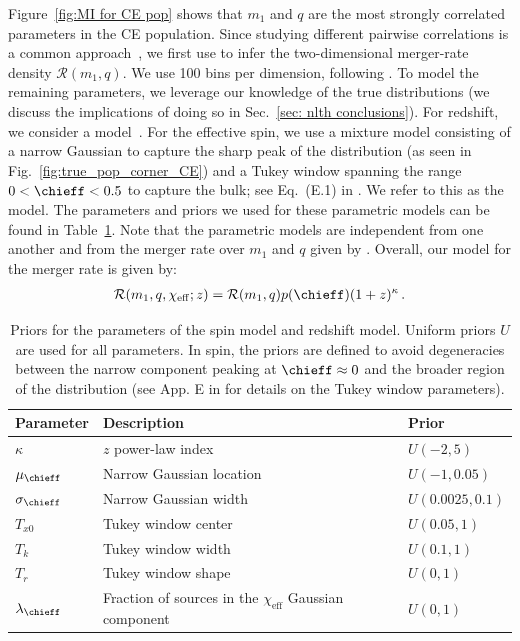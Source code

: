 \begin{refsection}
Figure~\ref{fig:MI for CE pop} shows that $m_1$ and $q$ are the most strongly correlated parameters in the \ac{CE} population. Since studying different pairwise correlations is a common approach~\citep{Heinzel:2024hva}, we first use \PixelPop to infer the two-dimensional merger-rate density $\mathcal{R}(m_1,q)$. We use 100 bins per dimension, following \citet{Heinzel:2024jlc}. To model the remaining parameters, we leverage our knowledge of the true distributions (we discuss the implications of doing so in Sec.~\ref{sec: nlth conclusions}). For redshift, we consider a \pr model~\citep{Fishbach:2018edt}. For the effective spin, we use a mixture model consisting of a narrow Gaussian to capture the sharp peak of the distribution (as seen in Fig.~\ref{fig:true_pop_corner_CE}) and a Tukey window spanning the range $0 < \chieff < 0.5$ to capture the bulk; see Eq.~(E.1) in \citet{Vitale:2022dpa}. We refer to this as the \PeakTukey model.
%
The parameters and priors we used for these parametric models can be found in Table~\ref{tab:parametric-params}. Note that the parametric models are independent from one another and from the merger rate over $m_1$ and $q$ given by \PixelPop. Overall, our model for the merger rate is given by:
\begin{align}
\mathcal{R} ( m_1 , q , \chi_\mathrm{eff} ; z )
=
\mathcal{R} ( m_1, q)
p ( \chieff ) (1+z)^{\kappa}
\, .
\label{eq: 2d rate}
\end{align}

\begin{table}
\renewcommand{\arraystretch}{1.25}
\centering
\begin{tabular}{lll}
\hline\hline
\textbf{Parameter} & \textbf{Description} & \textbf{Prior} \\ \hline
$\kappa$ & $z$ power-law index & $U(-2, 5)$       \\ \hline
$\mu_{\chieff}$ & Narrow Gaussian location  & $U(-1, 0.05)$ \\
$\sigma_{\chieff}$  & Narrow Gaussian width     & $U(0.0025, 0.1)$ \\
$T_{x0}$ & Tukey window center & $U(0.05, 1)$ \\
$T_k$ & Tukey window width & $U(0.1, 1)$ \\
$T_r$ & Tukey window shape & $U(0, 1)$ \\
$\lambda_{\chieff}$ & 
\begin{minipage}[t]{0.4\linewidth}
  \raggedright 
  Fraction of sources in the $\chi_{\mathrm{eff}}$ Gaussian component
\end{minipage} & $U(0, 1)$ \\ \hline\hline
\end{tabular}
\caption{Priors for the parameters of the \PeakTukey spin model and \pr redshift model. Uniform priors $U$ are used for all parameters. In spin, the priors are defined to avoid degeneracies between the narrow component peaking at $\chieff\approx0$ and the broader region of the distribution (see App. E in \citet{Vitale:2022dpa} for details on the Tukey window parameters).
}
\label{tab:parametric-params}
\end{table}


\end{refsection}
